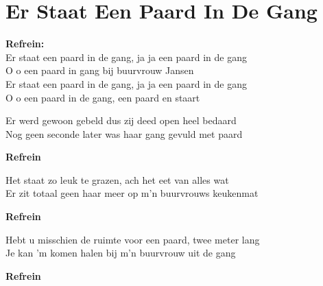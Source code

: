 \section{Er Staat Een Paard In De Gang}
\textbf{Refrein:}\\
Er staat een paard in de gang, ja ja een paard in de gang\\
O o een paard in gang bij buurvrouw Jansen\\
Er staat een paard in de gang, ja ja een paard in de gang\\
O o een paard in de gang, een paard en staart

Er werd gewoon gebeld dus zij deed open heel bedaard\\
Nog geen seconde later was haar gang gevuld met paard

\textbf{Refrein}

Het staat zo leuk te grazen, ach het eet van alles wat\\
Er zit totaal geen haar meer op m'n buurvrouws keukenmat

\textbf{Refrein}

Hebt u misschien de ruimte voor een paard, twee meter lang\\
Je kan 'm komen halen bij m'n buurvrouw uit de gang

\textbf{Refrein}
